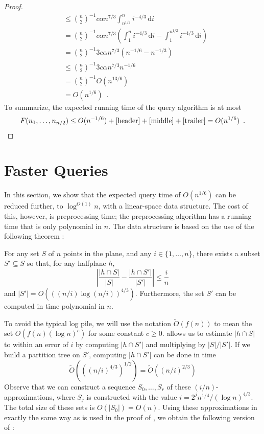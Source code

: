 \documentclass{patmorin}
\begin{document}
\begin{proof}
\begin{align*}
      & \le \binom{n}{2}^{-1}
       c\alpha n^{7/3}\int_{n^{1/2}}^{n} i^{-4/3}\,\mathrm{d}i \\
      & = \binom{n}{2}^{-1} 
       c\alpha n^{7/3}\left(\int_{1}^{n} i^{-4/3}\,\mathrm{d}i
         - \int_{1}^{n^{1/2}} i^{-4/3}\,\mathrm{d}i  \right) \\
      & = \binom{n}{2}^{-1} 
       3c\alpha n^{7/3}\left(n^{-1/6} - n^{-1/3}\right) \\
      & \le \binom{n}{2}^{-1} 
       3c\alpha n^{7/3}n^{-1/6} \\
      & = \binom{n}{2}^{-1} O(n^{13/6}) \\
      & = O(n^{1/6}) \enspace .
  \end{align*}
  To summarize, the expected running time of the query algorithm is at most
  \[ 
     F(n_1,\ldots,n_{n/2}) \le O(n^{-1/6})+\eqref{header} + \eqref{middle} + \eqref{trailer}
     = O(n^{1/6}) \enspace . \qedhere
  \]
\end{proof}


\section{Faster Queries}

In this section, we show that the expected query time of $O(n^{1/6})$
can be reduced further, to $\log^{O(1)} n$, with a linear-space
data structure.  The cost of this, however, is preprocessing time;
the preprocessing algorithm has a running time that is only polynomial
in $n$.  The data structure is based on the use of the following theorem
\cite[Theorem~1.4 and Corollary~3.3]{mww93}:

\begin{thm}
  For any set $S$ of $n$ points in the plane, and any $i\in\{1,\ldots,n\}$,
  there exists a subset $S'\subseteq S$ so that, for any halfplane $h$,
  \[  \left|\frac{|h\cap S|}{|S|} - \frac{|h\cap S'|}{|S'|}\right| \le \frac{i}{n} \] 
  and $|S'| = O(((n/i)\log (n/i))^{4/3})$.  Furthermore, the set $S'$
  can be computed in time polynomial in $n$.
\end{thm}

\newcommand{\Oh}{\tilde{O}}

To avoid the typical log pile, we will use the notation $\Oh(f(n))$
to mean the set $O(f(n)(\log n)^c)$ for some constant $c \ge 0$.
 allows us to estimate $|h\cap S|$ to within an error
of $i$ by computing $|h\cap S'|$ and multiplying by $|S|/|S'|$.  If we
build a partition tree on $S'$, computing $|h\cap S'|$ can be done in time
\[
 \Oh(((n/i)^{4/3})^{1/2}) 
    = \Oh((n/i)^{2/3})
\]
Observe that we can construct a sequence $S_0,\ldots,S_r$ of these
$(i/n)$-approximations, where $S_j$ is constructed with the
value $i=2^jn^{1/4}/(\log n)^{4/3}$.  The total size of these sets is
$O(|S_0|)=O(n)$.  Using these approximations in exactly the same way
as  is used in the proof of ,
we obtain the following version of :
\end{document}
